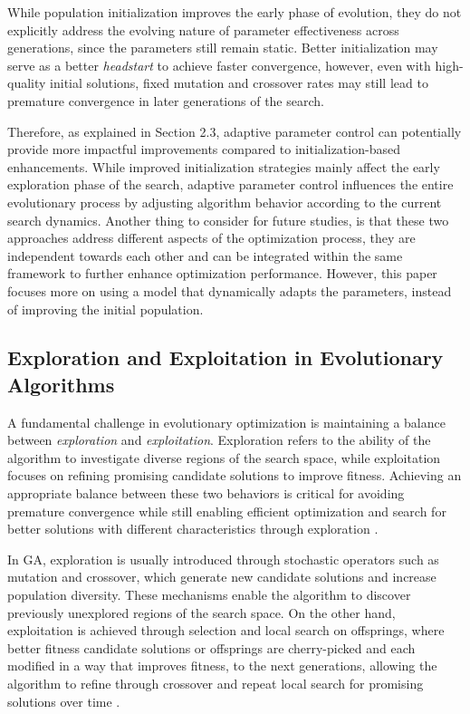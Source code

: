 \documentclass{article}
\begin{document}
While population initialization improves the early phase of evolution, they do not explicitly address the evolving nature of parameter effectiveness across generations, since the parameters still remain static. Better initialization may serve as a better \textit{headstart} to achieve faster convergence, however, even with high-quality initial solutions, fixed mutation and crossover rates may still lead to premature convergence in later generations of the search. 

Therefore, as explained in Section 2.3, adaptive parameter control can potentially provide more impactful improvements compared to initialization-based enhancements. While improved initialization strategies mainly affect the early exploration phase of the search, adaptive parameter control influences the entire evolutionary process by adjusting algorithm behavior according to the current search dynamics. Another thing to consider for future studies, is that these two approaches address different aspects of the optimization process, they are independent towards each other and can be integrated within the same framework to further enhance optimization performance. However, this paper focuses more on using a model that dynamically adapts the parameters, instead of improving the initial population.

\subsection{Exploration and Exploitation in Evolutionary Algorithms}
A fundamental challenge in evolutionary optimization is maintaining a balance between \textit{exploration} and \textit{exploitation}. Exploration refers to the ability of the algorithm to investigate diverse regions of the search space, while exploitation focuses on refining promising candidate solutions to improve fitness. Achieving an appropriate balance between these two behaviors is critical for avoiding premature convergence while still enabling efficient optimization and search for better solutions with different characteristics through exploration \parencite{eiben1999parametercontrol}.

In GA, exploration is usually introduced through stochastic operators such as mutation and crossover, which generate new candidate solutions and increase population diversity. These mechanisms enable the algorithm to discover previously unexplored regions of the search space. On the other hand, exploitation is achieved through selection and local search on offsprings, where better fitness candidate solutions or offsprings are cherry-picked and each modified in a way that improves fitness, to the next generations, allowing the algorithm to refine through crossover and repeat local search for promising solutions over time \parencite{goldberg1989genetic}.
\end{document}
